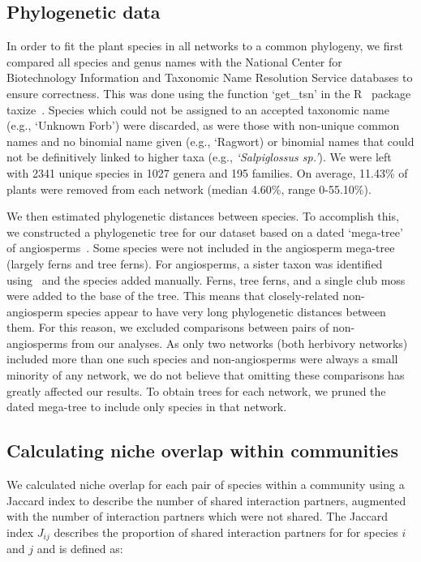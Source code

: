 \documentclass[12pt]{article}
\begin{document}
\begin{spacing}{1.5}
\subsection*{Phylogenetic data}

  In order to fit the plant species in all networks to a common phylogeny, 
  we first compared all species and genus names with the 
  National Center for Biotechnology Information
  and Taxonomic Name Resolution Service databases to ensure
  correctness. This was done using the function `get\_tsn' in the R~\citep{R}
  package taxize~\citep{taxize1,taxize2}. Species which could not 
  be assigned to an accepted taxonomic name (e.g., `Unknown Forb') were 
  discarded, as were those with non-unique common names and no binomial 
  name given (e.g., `Ragwort) or binomial names that could not be definitively 
  linked to  higher taxa (e.g., \emph{`Salpiglossus sp.'}). We were left with 
  2341 unique species in 1027 genera and 195 families. On average, 11.43\% of 
  plants were removed from each network (median 4.60\%, range 0-55.10\%).


  We then estimated phylogenetic distances between species. To accomplish 
  this, we constructed a phylogenetic tree for our dataset based on a dated
  `mega-tree' of angiosperms~\citep{Zanne2014}. Some species were not included
  in the angiosperm mega-tree (largely ferns and tree ferns). For angiosperms,
  a sister taxon was identified using~\citet{APW} and the species added manually.
  Ferns, tree ferns, and a single club moss were added to the base of the tree.
  This means that closely-related non-angiosperm species appear to have very long 
  phylogenetic distances between them. For this reason, we excluded comparisons 
  between pairs of non-angiosperms from our analyses. As only two networks (both 
  herbivory networks) included more than one such species and non-angiosperms
  were always a small minority of any network, we do not 
  believe that omitting these comparisons has greatly affected our results.
  To obtain trees for each network, we 
  pruned the dated mega-tree to include only species in that network.


\subsection*{Calculating niche overlap within communities}

  We calculated niche overlap for each pair of species within a community 
  using a Jaccard index to describe the number of shared interaction 
  partners, augmented with the number of interaction partners which were 
  not shared. The Jaccard index $J_{ij}$ describes the proportion of 
  shared interaction partners for for species $i$ and $j$ and is defined as: 


\end{spacing}
\end{document}

